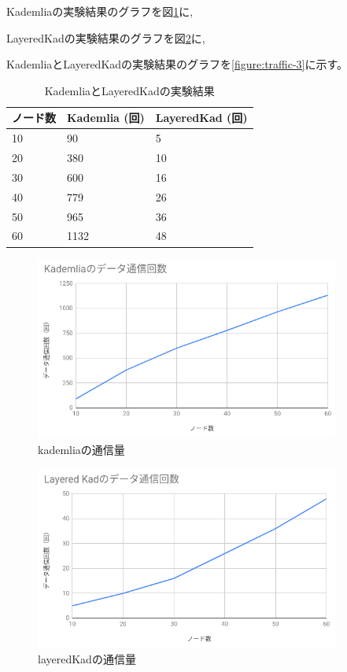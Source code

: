 \documentclass[sotsuron]{jcsie}
\begin{document}
Kademliaの実験結果のグラフを図\ref{figure:traffic-1}に,

LayeredKadの実験結果のグラフを図\ref{figure:traffic-2}に,

KademliaとLayeredKadの実験結果のグラフを\ref{figure:traffic-3}に示す。

\begin{table}[H]
	\caption{KademliaとLayeredKadの実験結果}
	\centering
	\label{table:traffic-result}
	\begin{tabular}{|l|l|l|}
		\hline
		ノード数   &   
		Kademlia (回) &   
		LayeredKad (回)\\
		\hline
		10             &   
		90             &   
		5\\
		\hline
		20             &   
		380            &   
		10\\
		\hline
		30             &   
		600            &   
		16\\
		\hline
		40             &   
		779            &   
		26\\
		\hline
		50             &   
		965            &   
		36\\
		\hline
		60             &   
		1132           &   
		48\\
		\hline
	\end{tabular}
\end{table}

\begin{figure}[H]
	\centering
	\includegraphics[width=10cm]{./assets/image/kad_traffic.png}
	\caption{kademliaの通信量}
	\label{figure:traffic-1}
\end{figure}

\begin{figure}[H]
	\centering
	\includegraphics[width=10cm]{./assets/image/layered-kad_traffic.png}
	\caption{layeredKadの通信量}
	\label{figure:traffic-2}
\end{figure}
\end{document}
